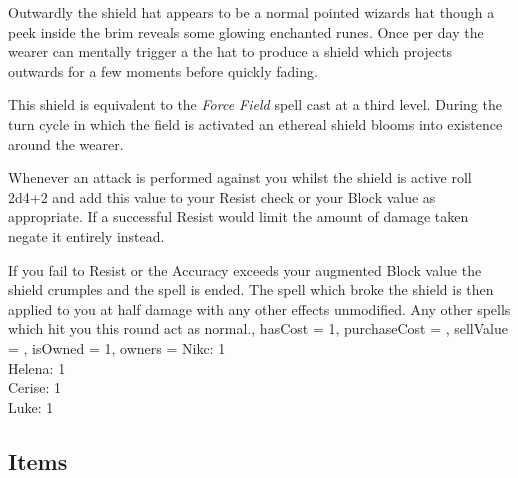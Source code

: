 \documentclass[8pt,twocolumn]{article}
\begin{document}
{{Outwardly\comma{} the shield hat appears to be a normal pointed wizard\apos{}s hat\comma{} though a peek inside the brim reveals some glowing enchanted runes. Once per day\comma{} the wearer can mentally trigger a the hat to produce a shield which projects outwards for a few moments\comma{} before quickly fading. 

This shield is equivalent to the {\it Force Field} spell cast at a third level. During the turn cycle in which the field is activated\comma{} an ethereal shield blooms into existence around the wearer.

Whenever an attack is performed against you whilst the shield is active\comma{} roll 2d4+2 and add this value to your Resist check or your Block value\comma{} as appropriate. If a successful Resist would limit the amount of damage taken\comma{} negate it entirely instead. 

If you fail to Resist\comma{} or the Accuracy exceeds your augmented Block value\comma{} the shield crumples and the spell is ended. The spell which broke the shield is then applied to you at half damage\comma{} with any other effects unmodified. Any other spells which hit you this round act as normal., 
	hasCost = 1, 
	purchaseCost = , 
	sellValue = , 
	isOwned = 1, 
	owners = Nikc: 1\\Helena: 1\\Cerise: 1\\Luke: 1\\
}

 \subsection{Items}


}
\end{document}

